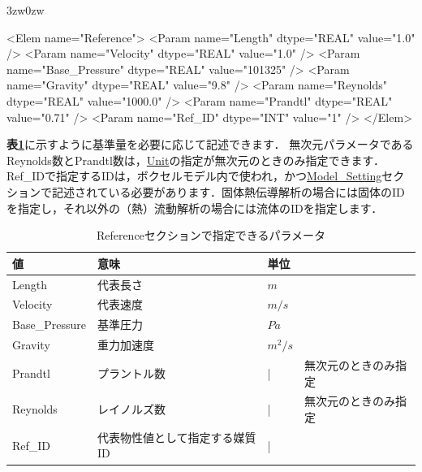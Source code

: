 \begin{indentation}{3zw}{0zw}

{\small
\begin{program}
<Elem name="Reference">
  <Param name="Length"        dtype="REAL" value="1.0" />
  <Param name="Velocity"      dtype="REAL" value="1.0" />
  <Param name="Base_Pressure" dtype="REAL" value="101325" />
  <Param name="Gravity"       dtype="REAL" value="9.8" />
  <Param name="Reynolds"      dtype="REAL" value="1000.0" />
  <Param name="Prandtl"       dtype="REAL" value="0.71" />
  <Param name="Ref_ID"        dtype="INT"  value="1" />
</Elem>
\end{program}
}

\noindent \textbf{表\ref{tbl:ref_value}}に示すように基準量を必要に応じて記述できます．
無次元パラメータであるReynolds数とPrandtl数は，\hyperlink{tgt:unit}{Unit}の指定が無次元のときのみ指定できます．
Ref\_IDで指定するIDは，ボクセルモデル内で使われ，かつ\hyperlink{tgt:model_setting}{Model\_Setting}セクションで記述されている必要があります．固体熱伝導解析の場合には固体のIDを指定し，それ以外の（熱）流動解析の場合には流体のIDを指定します．

\begin{table}[htdp]
\caption{Referenceセクションで指定できるパラメータ}
\begin{center}
\small
\begin{tabular}{llll} \toprule
値 & 意味 & 単位\\ \midrule
Length & 代表長さ & $m$ &\\
Velocity & 代表速度 & $m/s$ &\\
Base\_Pressure & 基準圧力 & $Pa$ &\\
Gravity & 重力加速度 & $m^2/s$ &\\
Prandtl & プラントル数 & | & 無次元のときのみ指定\\
Reynolds & レイノルズ数 & | & 無次元のときのみ指定\\
Ref\_ID & 代表物性値として指定する媒質ID & | &\\ \bottomrule
\end{tabular}
\end{center}
\label{tbl:ref_value}
\end{table}

\end{indentation}



\pagebreak
